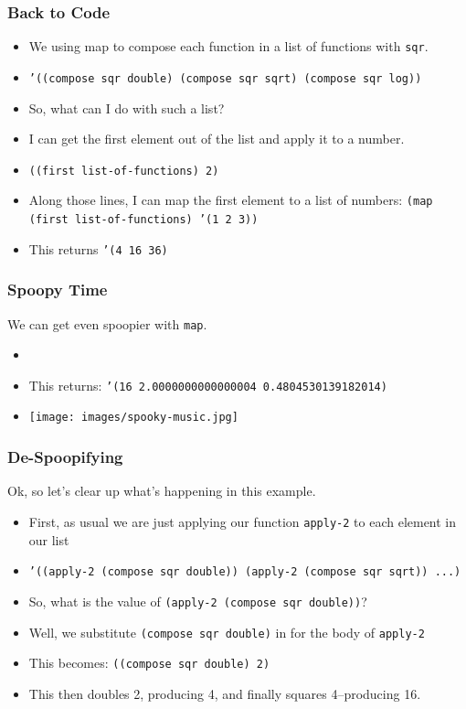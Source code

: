 \documentclass{beamer}
\begin{document}
\begin{frame}
  \frametitle{Back to Code}
  \begin{itemize}
  \item<2-> We using map to compose each function in a list of functions
    with \texttt{sqr}.
  \item<3-> \texttt{'((compose sqr double) (compose sqr sqrt) (compose sqr log))}
  \item<4-> So, what can I do with such a list?
  \item<5-> I can get the first element out of the list and apply it to
    a number.
  \item<6-> \texttt{((first list-of-functions) 2)}
  \item<7-> Along those lines, I can map the first element to a list of numbers:
    \texttt{(map (first list-of-functions) '(1 2 3))}
  \item<8-> This returns \texttt{'(4 16 36)}
  \end{itemize}
\end{frame}

  
\begin{frame}
  \frametitle{Spoopy Time}
  We can get even spoopier with \texttt{map}.
  \begin{itemize}
  \item<2-> \spoopy
  \item<3-> This returns: \texttt{'(16 2.0000000000000004 0.4804530139182014)}
  \item<4-> \texttt{[image: images/spooky-music.jpg]}
  \end{itemize}
\end{frame}

\begin{frame}
  \frametitle{De-Spoopifying}
  Ok, so let's clear up what's happening in this example.
  \begin{itemize}
  \item<2-> First, as usual we are just applying our function \texttt{apply-2} to each element in our list
  \item<3-> \texttt{'((apply-2 (compose sqr double)) (apply-2 (compose sqr sqrt)) ...)}
  \item<4-> So, what is the value of \texttt{(apply-2 (compose sqr double))}?
  \item<5-> Well, we substitute \texttt{(compose sqr double)} in for
    the body of \texttt{apply-2}
  \item<6-> This becomes: \texttt{((compose sqr double) 2)}
  \item<7-> This then doubles 2, producing 4, and finally squares 4--producing 16.
  \end{itemize}
\end{frame}
\end{document}
